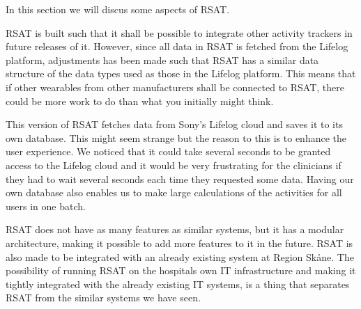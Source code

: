 \documentclass{cslthse-msc}
\begin{document}
In this section we will discus some aspects of RSAT. 

RSAT is built such that it shall be possible to integrate other activity trackers in future releases of it. However, since all data in RSAT is fetched from the Lifelog platform, adjustments has been made such that RSAT has a similar data structure of the data types used as those in the Lifelog platform. This means that if other wearables from other manufacturers shall be connected to RSAT, there could be more work to do than what you initially might think. 

This version of RSAT fetches data from Sony’s Lifelog cloud and saves it to its own database. This might seem strange but the reason to this is to enhance the user experience. We noticed that it could take several seconds to be granted access to the Lifelog cloud and it would be very frustrating for the clinicians if they had to wait several seconds each time they requested some data. Having our own database also enables us to make large calculations of the activities for all users in one batch.  

RSAT does not have as many features as similar systems, but it has a modular architecture, making it possible to add more features to it in the future. RSAT is also made to be integrated with an already existing system at Region Skåne. The possibility of running RSAT on the hospitals own IT infrastructure and making it tightly integrated with the already existing IT systems, is a thing that separates RSAT from the similar systems we have seen. 



\end{document}
